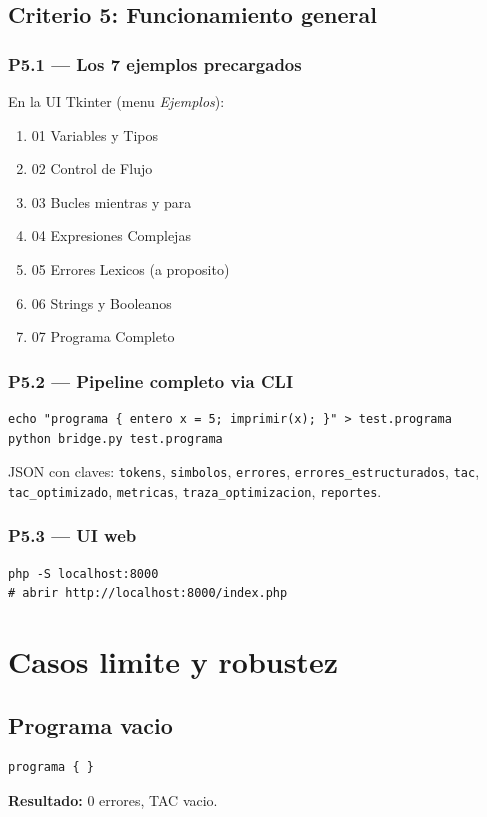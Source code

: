 \documentclass[11pt,a4paper]{article}
\begin{document}
\subsection{Criterio 5: Funcionamiento general}

\subsubsection{P5.1 --- Los 7 ejemplos precargados}

En la UI Tkinter (menu \emph{Ejemplos}):
\begin{enumerate}[leftmargin=*,nosep]
  \item 01 Variables y Tipos
  \item 02 Control de Flujo
  \item 03 Bucles mientras y para
  \item 04 Expresiones Complejas
  \item 05 Errores Lexicos (a proposito)
  \item 06 Strings y Booleanos
  \item 07 Programa Completo
\end{enumerate}

\subsubsection{P5.2 --- Pipeline completo via CLI}
\begin{lstlisting}[style=tac]
echo "programa { entero x = 5; imprimir(x); }" > test.programa
python bridge.py test.programa
\end{lstlisting}
JSON con claves: \texttt{tokens}, \texttt{simbolos}, \texttt{errores},
\texttt{errores\_estructurados}, \texttt{tac}, \texttt{tac\_optimizado},
\texttt{metricas}, \texttt{traza\_optimizacion}, \texttt{reportes}.

\subsubsection{P5.3 --- UI web}
\begin{lstlisting}[style=tac]
php -S localhost:8000
# abrir http://localhost:8000/index.php
\end{lstlisting}

\section{Casos limite y robustez}

\subsection{Programa vacio}
\begin{lstlisting}[style=ml]
programa { }
\end{lstlisting}
\textbf{Resultado:} 0 errores, TAC vacio.
\end{document}
